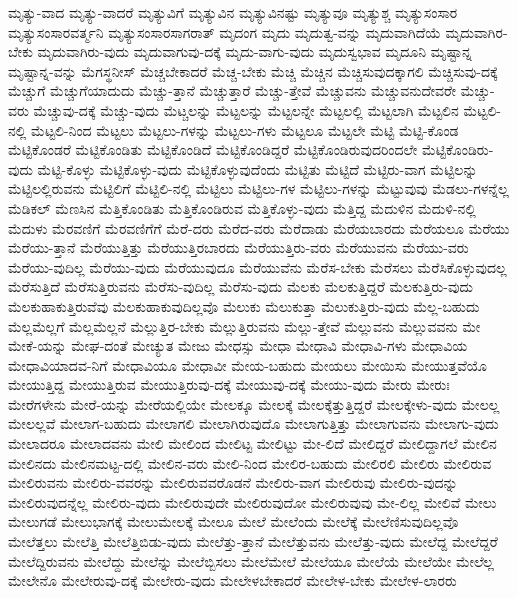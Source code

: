{ಮೃತ್ಯು-ವಾದ
ಮೃತ್ಯು-ವಾದರೆ
ಮೃತ್ಯುವಿಗೆ
ಮೃತ್ಯುವಿನ
ಮೃತ್ಯುವಿನಷ್ಟು
ಮೃತ್ಯುವೂ
ಮೃತ್ಯುಶ್ಚ
ಮೃತ್ಯುಸಂಸಾರ
ಮೃತ್ಯುಸಂಸಾರವರ್ತ್ಮನಿ
ಮೃತ್ಯುಸಂಸಾರಸಾಗರಾತ್
ಮೃದಂಗ
ಮೃದು
ಮೃದುತ್ವ-ವನ್ನು
ಮೃದುವಾಗಿದೆಯೆ
ಮೃದುವಾಗಿರ-ಬೇಕು
ಮೃದುವಾಗಿರು-ವುದು
ಮೃದುವಾಗುವು-ದಕ್ಕೆ
ಮೃದು-ವಾಗು-ವುದು
ಮೃದುಸ್ವಭಾವ
ಮೃದೂನಿ
ಮೃಷ್ಟಾನ್ನ
ಮೃಷ್ಟಾನ್ನ-ವನ್ನು
ಮೆಗಸ್ಥನೀಸ್
ಮೆಚ್ಚಬೇಕಾದರೆ
ಮೆಚ್ಚ-ಬೇಕು
ಮೆಚ್ಚಿ
ಮೆಚ್ಚಿನ
ಮೆಚ್ಚಿಸುವುದಕ್ಕಾಗಲಿ
ಮೆಚ್ಚಿಸುವು-ದಕ್ಕೆ
ಮೆಚ್ಚುಗೆ
ಮೆಚ್ಚುಗೆಯಾದುದು
ಮೆಚ್ಚು-ತ್ತಾನೆ
ಮೆಚ್ಚುತ್ತಾರೆ
ಮೆಚ್ಚು-ತ್ತೇವೆ
ಮೆಚ್ಚುವನು
ಮೆಚ್ಚುವನುದೇವರೇ
ಮೆಚ್ಚು-ವರು
ಮೆಚ್ಚುವು-ದಕ್ಕೆ
ಮೆಚ್ಚು-ವುದು
ಮೆಟ್ಚಲನ್ನು
ಮೆಟ್ಟಲನ್ನು
ಮೆಟ್ಟಲನ್ನೇ
ಮೆಟ್ಟಲಲ್ಲಿ
ಮೆಟ್ಟಲಾಗಿ
ಮೆಟ್ಟಲಿನ
ಮೆಟ್ಟಲಿ-ನಲ್ಲಿ
ಮೆಟ್ಟಲಿ-ನಿಂದ
ಮೆಟ್ಟಲು
ಮೆಟ್ಟಲು-ಗಳನ್ನು
ಮೆಟ್ಟಲು-ಗಳು
ಮೆಟ್ಟಲೂ
ಮೆಟ್ಟಲೇ
ಮೆಟ್ಟಿ
ಮೆಟ್ಟಿ-ಕೊಂಡ
ಮೆಟ್ಟಿಕೊಂಡರೆ
ಮೆಟ್ಟಿಕೊಂಡಿತು
ಮೆಟ್ಟಿಕೊಂಡಿದೆ
ಮೆಟ್ಟಿಕೊಂಡಿದ್ದರೆ
ಮೆಟ್ಟಿಕೊಂಡಿರುವುದರಿಂದಲೇ
ಮೆಟ್ಟಿಕೊಂಡಿರು-ವುದು
ಮೆಟ್ಟಿ-ಕೊಳ್ಳು
ಮೆಟ್ಟಿಕೊಳ್ಳು-ವುದು
ಮೆಟ್ಟಿಕೊಳ್ಳುವುದೆಂದು
ಮೆಟ್ಟಿತು
ಮೆಟ್ಟಿದೆ
ಮೆಟ್ಟಿರು-ವಾಗ
ಮೆಟ್ಟಿಲನ್ನು
ಮೆಟ್ಟಿಲಲ್ಲಿರುವನು
ಮೆಟ್ಟಿಲಿಗೆ
ಮೆಟ್ಟಿಲಿ-ನಲ್ಲಿ
ಮೆಟ್ಟಿಲು
ಮೆಟ್ಟಿಲು-ಗಳ
ಮೆಟ್ಟಿಲು-ಗಳನ್ನು
ಮೆಟ್ಟುವುವು
ಮೆಡಲು-ಗಳನ್ನೆಲ್ಲ
ಮೆಡಿಕಲ್
ಮೆಣಸಿನ
ಮೆತ್ತಿಕೊಂಡಿತು
ಮೆತ್ತಿಕೊಂಡಿರುವ
ಮೆತ್ತಿಕೊಳ್ಳು-ವುದು
ಮೆತ್ತಿದ್ದ
ಮೆದುಳಿನ
ಮೆದುಳಿ-ನಲ್ಲಿ
ಮೆದುಳು
ಮೆರವಣಿಗೆ
ಮೆರವಣಿಗೆಗೆ
ಮೆರೆ-ದರು
ಮೆರೆದ-ವರು
ಮೆರೆದಾಡು
ಮೆರೆಯಬಾರದು
ಮೆರೆಯಲೂ
ಮೆರೆಯು
ಮೆರೆಯು-ತ್ತಾನೆ
ಮೆರೆಯುತ್ತಿತ್ತು
ಮೆರೆಯುತ್ತಿರಬಾರದು
ಮೆರೆಯುತ್ತಿರು-ವರು
ಮೆರೆಯುವನು
ಮೆರೆಯು-ವರು
ಮೆರೆಯು-ವುದಿಲ್ಲ
ಮೆರೆಯು-ವುದು
ಮೆರೆಯುವುದೂ
ಮೆರೆಯುವೆನು
ಮೆರೆಸ-ಬೇಕು
ಮೆರೆಸಲು
ಮೆರೆಸಿಕೊಳ್ಳುವುದಲ್ಲ
ಮೆರೆಸುತ್ತಿದೆ
ಮೆರೆಸುತ್ತಿರುವನು
ಮೆರೆಸು-ವುದಿಲ್ಲ
ಮೆರೆಸು-ವುದು
ಮೆಲಕು
ಮೆಲಕುತ್ತಿದ್ದರೆ
ಮೆಲಕುತ್ತಿರು-ವುದು
ಮೆಲಕುಹಾಕುತ್ತಿರುವೆವು
ಮೆಲಕುಹಾಕುವುದಿಲ್ಲವೊ
ಮೆಲುಕು
ಮೆಲುಕುತ್ತಾ
ಮೆಲುಕುತ್ತಿರು-ವುದು
ಮೆಲ್ಲ-ಬಹುದು
ಮೆಲ್ಲಮೆಲ್ಲಗೆ
ಮೆಲ್ಲಮೆಲ್ಲನೆ
ಮೆಲ್ಲುತ್ತಿರ-ಬೇಕು
ಮೆಲ್ಲುತ್ತಿರುವನು
ಮೆಲ್ಲು-ತ್ತೇವೆ
ಮೆಲ್ಲುವನು
ಮೆಲ್ಲುವವನು
ಮೇ
ಮೇಕೆ-ಯನ್ನು
ಮೇಘ-ದಂತೆ
ಮೇಚ್ಯುತ
ಮೇಜು
ಮೇಧಸ್ಸು
ಮೇಧಾ
ಮೇಧಾವಿ
ಮೇಧಾವಿ-ಗಳು
ಮೇಧಾವಿಯ
ಮೇಧಾವಿಯಾದವ-ನಿಗೆ
ಮೇಧಾವಿಯೂ
ಮೇಧಾವೀ
ಮೇಯ-ಬಹುದು
ಮೇಯಲು
ಮೇಯಿಸು
ಮೇಯುತ್ತವೆಯೊ
ಮೇಯುತ್ತಿದ್ದ
ಮೇಯುತ್ತಿರುವ
ಮೇಯುತ್ತಿರುವು-ದಕ್ಕೆ
ಮೇಯುವು-ದಕ್ಕೆ
ಮೇಯು-ವುದು
ಮೇರು
ಮೇರುಃ
ಮೇರೆಗಳೇನು
ಮೇರೆ-ಯನ್ನು
ಮೇರೆಯಲ್ಲಿಯೇ
ಮೇಲಕ್ಕೂ
ಮೇಲಕ್ಕೆ
ಮೇಲಕ್ಕೆತ್ತುತ್ತಿದ್ದರೆ
ಮೇಲಕ್ಕೇಳು-ವುದು
ಮೇಲಲ್ಲ
ಮೇಲಲ್ಲವೆ
ಮೇಲಾಗ-ಬಹುದು
ಮೇಲಾಗಲಿ
ಮೇಲಾಗಿರುವುದೊ
ಮೇಲಾಗುತ್ತಿತ್ತು
ಮೇಲಾಗುವನು
ಮೇಲಾಗು-ವುದು
ಮೇಲಾದರೂ
ಮೇಲಾದವನು
ಮೇಲಿ
ಮೇಲಿಂದ
ಮೇಲಿಟ್ಟ
ಮೇಲಿಟ್ಟು
ಮೇ-ಲಿದೆ
ಮೇಲಿದ್ದರೆ
ಮೇಲಿದ್ದಾಗಲೆ
ಮೇಲಿನ
ಮೇಲಿನದು
ಮೇಲಿನಮಟ್ಟ-ದಲ್ಲಿ
ಮೇಲಿನ-ವರು
ಮೇಲಿ-ನಿಂದ
ಮೇಲಿರ-ಬಹುದು
ಮೇಲಿರಲಿ
ಮೇಲಿರು
ಮೇಲಿರುವ
ಮೇಲಿರುವನು
ಮೇಲಿರು-ವವರನ್ನು
ಮೇಲಿರುವವರೊಡನೆ
ಮೇಲಿರು-ವಾಗ
ಮೇಲಿರುವು
ಮೇಲಿರು-ವುದನ್ನು
ಮೇಲಿರುವುದನ್ನೆಲ್ಲ
ಮೇಲಿರು-ವುದು
ಮೇಲಿರುವುದೇ
ಮೇಲಿರುವುದೋ
ಮೇಲಿರುವುವು
ಮೇ-ಲಿಲ್ಲ
ಮೇಲಿವೆ
ಮೇಲು
ಮೇಲುಗಡೆ
ಮೇಲುಭಾಗಕ್ಕೆ
ಮೇಲುಮೇಲಕ್ಕೆ
ಮೇಲೂ
ಮೇಲೆ
ಮೇಲೆಂದು
ಮೇಲೆಕ್ಕೆ
ಮೇಲೆಣಿಸುವುದಿಲ್ಲವೊ
ಮೇಲೆತ್ತಲು
ಮೇಲೆತ್ತಿ
ಮೇಲೆತ್ತಿಬಿಡು-ವುದು
ಮೇಲೆತ್ತು-ತ್ತಾನೆ
ಮೇಲೆತ್ತುವನು
ಮೇಲೆತ್ತು-ವುದು
ಮೇಲೆದ್ದ
ಮೇಲೆದ್ದರೆ
ಮೇಲೆದ್ದಿರುವನು
ಮೇಲೆದ್ದು
ಮೇಲೆನ್ನು
ಮೇಲೆಬ್ಬಿಸಲು
ಮೇಲೆಮೇಲೆ
ಮೇಲೆಯೂ
ಮೇಲೆಯೆ
ಮೇಲೆಯೇ
ಮೇಲೆಲ್ಲ
ಮೇಲೇನೊ
ಮೇಲೇರುವು-ದಕ್ಕೆ
ಮೇಲೇರು-ವುದು
ಮೇಲೇಳಬೇಕಾದರೆ
ಮೇಲೇಳ-ಬೇಕು
ಮೇಲೇಳ-ಲಾರರು
}

